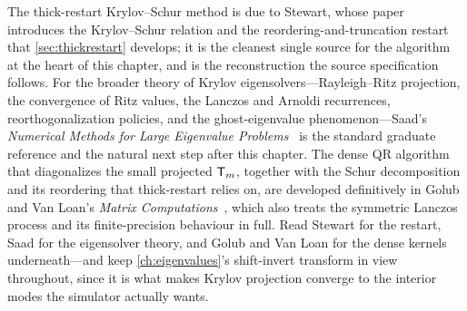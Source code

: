 \furtherreading
The thick-restart Krylov--Schur method is due to Stewart, whose paper~\citep{stewart2001krylovschur}
introduces the Krylov--Schur relation and the reordering-and-truncation restart that
\cref{sec:thickrestart} develops; it is the cleanest single source for the algorithm at the heart of
this chapter, and is the reconstruction the source specification follows. For the broader theory of
Krylov eigensolvers---Rayleigh--Ritz projection, the convergence of Ritz values, the Lanczos and
Arnoldi recurrences, reorthogonalization policies, and the ghost-eigenvalue phenomenon---Saad's
\emph{Numerical Methods for Large Eigenvalue Problems}~\citep{saad2011eig} is the standard graduate
reference and the natural next step after this chapter. The dense QR algorithm that diagonalizes the
small projected $\mathsf{T}_m$, together with the Schur decomposition and its reordering that
thick-restart relies on, are developed definitively in Golub and Van Loan's \emph{Matrix
Computations}~\citep{golubvanloan2013}, which also treats the symmetric Lanczos process and its
finite-precision behaviour in full. Read Stewart for the restart, Saad for the eigensolver theory,
and Golub and Van Loan for the dense kernels underneath---and keep \cref{ch:eigenvalues}'s
shift-invert transform in view throughout, since it is what makes Krylov projection converge to the
interior modes the simulator actually wants.

